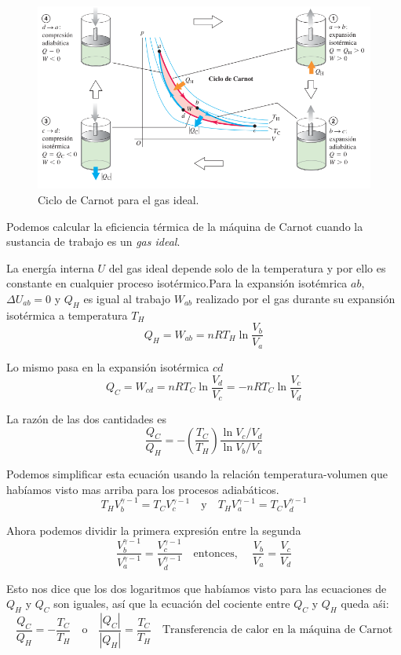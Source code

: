\documentclass[12pt]{article}
\begin{document}
  \begin{figure}[H]
    \centering
  \includegraphics[width=0.8\linewidth]{imagenes/ciclo-carnot.png}
    \caption{Ciclo de Carnot para el gas ideal.}
    \label{fig:ciclo-carnot}
  \end{figure}
  
  Podemos calcular la eficiencia térmica de la máquina de Carnot cuando la sustancia de trabajo es un \textit{gas ideal}.

  La energía interna $ U $ del gas ideal depende solo de la temperatura y por ello es constante en cualquier proceso isotérmico.Para la expansión isotémrica $ ab $, $ \Delta U_{ab} = 0 $ y $ Q_{H} $ es igual al trabajo $ W_{ab} $ realizado por el gas durante su expansión isotérmica a temperatura $ T_{H} $
  \[
  Q_{H} = W_{ab} = nRT_{H}\ln{\frac{V_{b}}{V_{a}}}
  \]

  Lo mismo pasa en la expansión isotérmica $ cd $
  \[
  Q_{C} = W_{cd} = nRT_{C}\ln{\frac{V_{d}}{V_{c}}} = -nRT_{C}\ln{\frac{V_{c}}{V_{d}}}
  \]

  La razón de las dos cantidades es 
  \[
  \frac{Q_{C}}{Q_{H}} = - \left(\frac{T_{C}}{T_{H}}\right)\frac{\ln{V_{c}/V_{d}}}{\ln{V_{b}/V_{a}}}
  \]

  Podemos simplificar esta ecuación usando la relación temperatura-volumen que habíamos visto mas arriba para los procesos adiabáticos.
  \[
  T_{H}V_{b}^{\gamma - 1} = T_{C}V_{c}^{\gamma-1} \quad \text{y} \quad T_{H}V_{a}^{\gamma-1} = T_{C}V_{d}^{\gamma - 1}
  \]

  Ahora podemos dividir la primera expresión entre la segunda
  \[
  \frac{V_{b}^{\gamma-1}}{V_{a}^{\gamma-1}} = \frac{V_{c}^{\gamma-1}}{V_{d}^{\gamma-1}} \quad \text{entonces, } \quad \frac{V_{b}}{V_{a}} = \frac{V_{c}}{V_{d}}
  \]

  Esto nos dice que los dos logaritmos que habíamos visto para las ecuaciones de $ Q_{H} $ y $ Q_{C} $ son iguales, así que la ecuación del cociente entre $ Q_{C} $ y $ Q_{H} $ queda aśi:
  \[
  \frac{Q_{C}}{Q_{H}} = -\frac{T_{C}}{T_{H}} \quad \text{o} \quad \frac{\left|Q_{C}\right|}{\left|Q_{H}\right|} = \frac{T_{C}}{T_{H}} \quad \text{Transferencia de calor en la máquina de Carnot}
  \]
\end{document}

